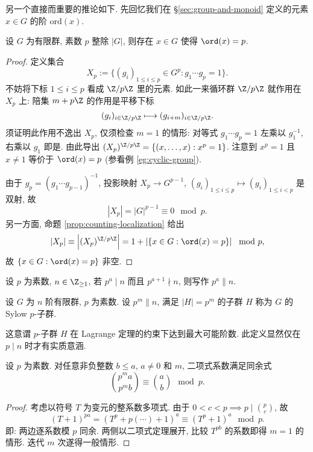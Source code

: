 另一个直接而重要的推论如下. 先回忆我们在 \S\ref{sec:group-and-monoid} 定义的元素 $x \in G$ 的阶 $\text{ord}(x)$.
\begin{corollary}[Cauchy 定理]\label{prop:group-Cauchy}
	设 $G$ 为有限群, 素数 $p$ 整除 $|G|$, 则存在 $x \in G$ 使得 $\ord(x)=p$.
\end{corollary}
\begin{proof}
	定义集合
	\[ X_p := \{(g_i)_{1 \leq i \leq p} \in G^p : g_1 \cdots g_p = 1 \}. \]
	不妨将下标 $1 \leq i \leq p$ 看成 $\Z/p\Z$ 里的元素. 如此一来循环群 $\Z/p\Z$ 就作用在 $X_p$ 上: 陪集 $m + p\Z$ 的作用是平移下标
	\[ (g_i)_{i \in \Z/p\Z} \longmapsto (g_{i+m})_{i \in \Z/p\Z}. \]
	须证明此作用不逸出 $X_p$, 仅须检查 $m=1$ 的情形: 对等式 $g_1 \cdots g_p = 1$ 左乘以 $g_1^{-1}$, 右乘以 $g_1$ 即是. 由此导出 $(X_p)^{\Z/p\Z} = \{(x, \ldots, x) : x^p = 1 \}$. 注意到 $x^p=1$ 且 $x \neq 1$ 等价于 $\ord(x)=p$ (参看例 \ref{eg:cyclic-group}).

	由于 $g_p = (g_1 \cdots g_{p-1})^{-1}$, 投影映射 $X_p \to G^{p-1}$, $(g_i)_{1 \leq i \leq p} \mapsto (g_i)_{1 \leq i < p}$ 是双射, 故
	\[ |X_p| = |G|^{p-1} \equiv 0 \mod p. \]
	另一方面, 命题 \ref{prop:counting-localization} 给出
	\[ |X_p| \equiv \left\lvert(X_p)^{\Z/p\Z}\right\rvert = 1 + \left\lvert \{x \in G : \ord(x)=p \} \right\rvert \mod p , \]
	故 $\{x \in G : \ord(x)=p \}$ 非空.
\end{proof}

\begin{convention}
	设 $p$ 为素数, $n \in \Z_{\geq 1}$, 若 $p^a \mid n$ 而且 $p^{a+1} \nmid n$, 则写作 $p^a \| n$.
\end{convention}

\begin{definition}
	设 $G$ 为 $n$ 阶有限群, $p$ 为素数. 设 $p^m \| n$, 满足 $|H| = p^m$ 的子群 $H$ 称为 $G$ 的 Sylow $p$-子群.
\end{definition}
这意谓 $p$-子群 $H$ 在 Lagrange 定理的约束下达到最大可能阶数. 此定义显然仅在 $p \mid n$ 时才有实质意涵.

\begin{lemma}\label{prop:Wielandt-lemma}
	设 $p$ 为素数. 对任意非负整数 $b \leq a$, $a \neq 0$ 和 $m$, 二项式系数满足同余式
	\[ \binom{p^m a}{p^m b} \equiv \binom{a}{b} \mod p. \]
\end{lemma}
\begin{proof}
	考虑以符号 $T$ 为变元的整系数多项式. 由于 $0 < c < p \implies p \mid \binom{p}{c}$, 故
	\[ (T+1)^{pa} = \left( T^p + p(\cdots) + 1 \right)^a \equiv (T^p + 1)^a \mod p. \]
	即: 两边逐系数模 $p$ 同余. 两侧以二项式定理展开, 比较 $T^{pb}$ 的系数即得 $m=1$ 的情形. 迭代 $m$ 次遂得一般情形.
\end{proof}

